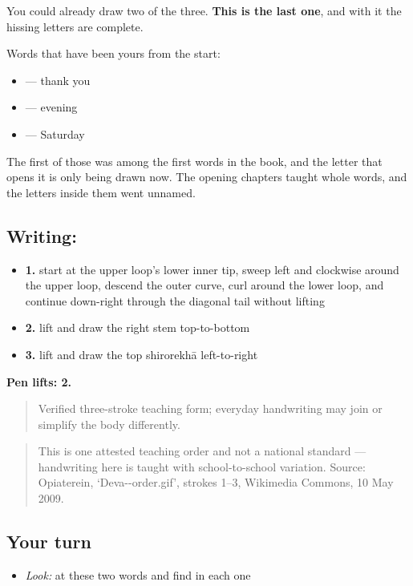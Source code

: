 You could already draw two of the three. \textbf{This is the last one}, and with it the hissing letters are complete.

Words that have been yours from the start:

\begin{itemize}
\raggedright
  \item \textbf{} — thank you
  \item \textbf{} — evening
  \item \textbf{} — Saturday
\end{itemize}

The first of those was among the first words in the book, and the letter that opens it is only being drawn now. The opening chapters taught whole words, and the letters inside them went unnamed.

\subsection*{Writing: }

\begin{itemize}
\raggedright
  \item \textbf{1.} start at the upper loop's lower inner tip, sweep left and clockwise around the upper loop, descend the outer curve, curl around the lower loop, and continue down-right through the diagonal tail without lifting
  \item \textbf{2.} lift and draw the right stem top-to-bottom
  \item \textbf{3.} lift and draw the top shirorekhā left-to-right
\end{itemize}

\textbf{Pen lifts: 2.}

\begin{quote}
Verified three-stroke teaching form; everyday handwriting may join or simplify the body differently.
\end{quote}

\begin{quote}
This is one attested teaching order and not a national standard — handwriting here is taught with school-to-school variation. Source: Opiaterein, ‘Deva--order.gif’, strokes 1–3, Wikimedia Commons, 10 May 2009.
\end{quote}

\subsection*{Your turn}
\begin{itemize}
\raggedright
  \item \emph{Look:} at these two words and find  in each one
\end{itemize}

